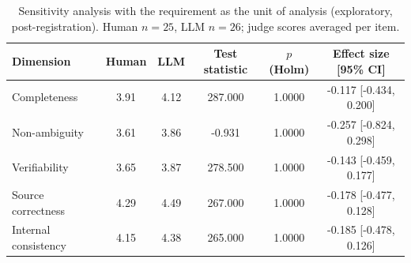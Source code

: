 \begin{table}[htbp]
\centering
\caption{Sensitivity analysis with the requirement as the unit of analysis (exploratory, post-registration). Human $n=25$, LLM $n=26$; judge scores averaged per item.}
\label{tab:por-item}
\small
\begin{tabular}{lccccc}
\toprule
Dimension & Human & LLM & Test statistic & $p$ (Holm) & Effect size [95\% CI] \\
\midrule
Completeness & 3.91 & 4.12 & 287.000 & 1.0000 & -0.117 [-0.434, 0.200] \\
Non-ambiguity & 3.61 & 3.86 & -0.931 & 1.0000 & -0.257 [-0.824, 0.298] \\
Verifiability & 3.65 & 3.87 & 278.500 & 1.0000 & -0.143 [-0.459, 0.177] \\
Source correctness & 4.29 & 4.49 & 267.000 & 1.0000 & -0.178 [-0.477, 0.128] \\
Internal consistency & 4.15 & 4.38 & 265.000 & 1.0000 & -0.185 [-0.478, 0.126] \\
\bottomrule
\end{tabular}
\end{table}
